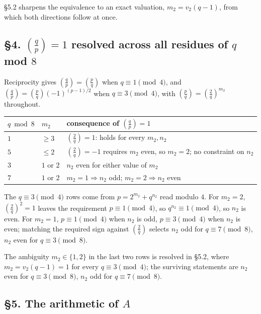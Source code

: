 \documentclass[11pt]{article}
\begin{document}
\S5.2 sharpens the equivalence to an exact valuation, $m_2 = v_2(q-1)$, from which both directions follow at once.

\subsection*{\S4. $\left(\frac{q}{p}\right) = 1$ resolved across all residues of $q$ mod $8$}

Reciprocity gives $\left(\frac{q}{p}\right) = \left(\frac{p}{q}\right)$ when $q \equiv 1 \pmod 4$, and $\left(\frac{q}{p}\right) = \left(\frac{p}{q}\right)(-1)^{(p-1)/2}$ when $q \equiv 3 \pmod 4$, with $\left(\frac{p}{q}\right) = \left(\frac{2}{q}\right)^{m_2}$ throughout.

\begin{center}
\begin{tabular}{lll}
\hline
$q \bmod 8$ & $m_2$ & consequence of $\left(\frac{q}{p}\right) = 1$ \\
\hline
$1$ & $\geq 3$ & $\left(\frac{2}{q}\right) = 1$: holds for every $m_2, n_2$ \\
$5$ & $\leq 2$ & $\left(\frac{2}{q}\right) = -1$ requires $m_2$ even, so $m_2 = 2$; no constraint on $n_2$ \\
$3$ & $1$ or $2$ & $n_2$ even for either value of $m_2$ \\
$7$ & $1$ or $2$ & $m_2 = 1 \Rightarrow n_2$ odd; $m_2 = 2 \Rightarrow n_2$ even \\
\hline
\end{tabular}
\end{center}

The $q \equiv 3 \pmod 4$ rows come from $p = 2^{m_2} + q^{n_2}$ read modulo $4$. For $m_2 = 2$, $\left(\frac{2}{q}\right)^2 = 1$ leaves the requirement $p \equiv 1 \pmod 4$, so $q^{n_2} \equiv 1 \pmod 4$, so $n_2$ is even. For $m_2 = 1$, $p \equiv 1 \pmod 4$ when $n_2$ is odd, $p \equiv 3 \pmod 4$ when $n_2$ is even; matching the required sign against $\left(\frac{2}{q}\right)$ selects $n_2$ odd for $q \equiv 7 \pmod 8$, $n_2$ even for $q \equiv 3 \pmod 8$.

The ambiguity $m_2 \in \{1,2\}$ in the last two rows is resolved in \S5.2, where $m_2 = v_2(q-1) = 1$ for every $q \equiv 3 \pmod 4$; the surviving statements are $n_2$ even for $q \equiv 3 \pmod 8$, $n_2$ odd for $q \equiv 7 \pmod 8$.

\subsection*{\S5. The arithmetic of $A$}
\end{document}
